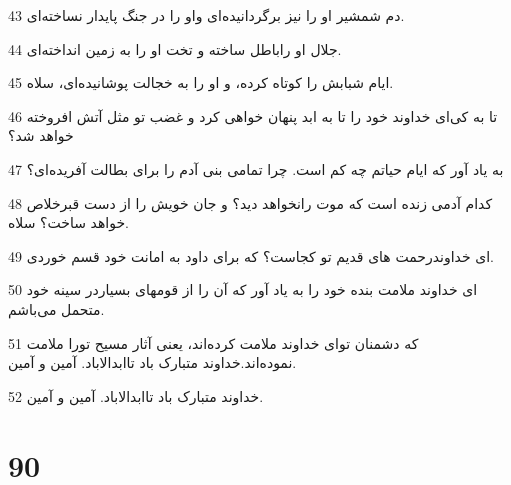 \par 43 دم شمشیر او را نیز برگردانیده‌ای واو را در جنگ پایدار نساخته‌ای.
\par 44 جلال او راباطل ساخته و تخت او را به زمین انداخته‌ای.
\par 45 ایام شبابش را کوتاه کرده، و او را به خجالت پوشانیده‌ای، سلاه.
\par 46 تا به کی‌ای خداوند خود را تا به ابد پنهان خواهی کرد و غضب تو مثل آتش افروخته خواهد شد؟
\par 47 به یاد آور که ایام حیاتم چه کم است. چرا تمامی بنی آدم را برای بطالت آفریده‌ای؟
\par 48 کدام آدمی زنده است که موت رانخواهد دید؟ و جان خویش را از دست قبرخلاص خواهد ساخت؟ سلاه.
\par 49 ‌ای خداوندرحمت های قدیم تو کجاست؟ که برای داود به امانت خود قسم خوردی.
\par 50 ‌ای خداوند ملامت بنده خود را به یاد آور که آن را از قومهای بسیاردر سینه خود متحمل می‌باشم.
\par 51 که دشمنان توای خداوند ملامت کرده‌اند، یعنی آثار مسیح تورا ملامت نموده‌اند.خداوند متبارک باد تاابدالاباد. آمین و آمین.
\par 52 خداوند متبارک باد تاابدالاباد. آمین و آمین.
 
\chapter{90}

